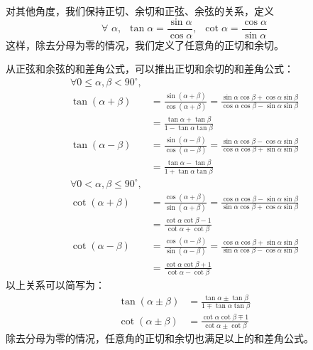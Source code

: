 \documentclass[12pt,UTF8]{ctexbook}
\begin{document}
对其他角度，我们保持正切、余切和正弦、余弦的关系，定义
$$ \forall \,\,  \alpha, \,\,\, \tan \alpha = \frac{\sin \alpha}{\cos \alpha}, \,\,\, \cot \alpha = \frac{\cos \alpha}{\sin \alpha}$$
这样，除去分母为零的情况，我们定义了任意角的正切和余切。

从正弦和余弦的和差角公式，可以推出正切和余切的和差角公式：
\begin{align*}
    \forall 0 \leqslant \alpha, \beta < 90^\circ, &  \\
    \tan (\alpha + \beta) &= \frac{\sin (\alpha + \beta)}{\cos (\alpha + \beta)} = \frac{\sin\alpha \cos \beta + \cos \alpha \sin\beta}{\cos \alpha \cos \beta - \sin\alpha \sin \beta}  \\
    &= \frac{\tan \alpha + \tan \beta}{1 - \tan \alpha \tan \beta}    \\ 
    \tan (\alpha - \beta) &= \frac{\sin (\alpha - \beta)}{\cos (\alpha - \beta)} = \frac{\sin\alpha \cos \beta - \cos \alpha \sin\beta}{\cos \alpha \cos \beta + \sin\alpha \sin \beta}  \\
    &= \frac{\tan \alpha - \tan \beta}{1 + \tan \alpha \tan \beta}  
\end{align*}
\begin{align*}
    \forall 0 < \alpha, \beta \leqslant 90^\circ, &  \\
    \cot (\alpha + \beta) &= \frac{\cos (\alpha + \beta)}{\sin (\alpha + \beta)} = \frac{\cos \alpha \cos \beta - \sin\alpha \sin \beta}{\sin\alpha \cos \beta + \cos \alpha \sin\beta}  \\
    &= \frac{\cot \alpha \cot \beta - 1}{\cot \alpha + \cot \beta}   \\
    \cot (\alpha - \beta) &= \frac{\cos (\alpha - \beta)}{\sin (\alpha - \beta)} = \frac{\cos \alpha \cos \beta + \sin\alpha \sin \beta}{\sin\alpha \cos \beta - \cos \alpha \sin\beta}  \\
    &= \frac{\cot \alpha \cot \beta + 1}{\cot \alpha - \cot \beta}   
\end{align*}
以上关系可以简写为：
\begin{align*}
    \tan (\alpha \pm \beta) &= \frac{\tan \alpha \pm \tan \beta}{1 \mp \tan \alpha \tan \beta}  \\
    \cot (\alpha \pm \beta) &= \frac{\cot \alpha \cot \beta \mp 1}{\cot \alpha \pm \cot \beta} 
\end{align*}
除去分母为零的情况，任意角的正切和余切也满足以上的和差角公式。
\end{document}
